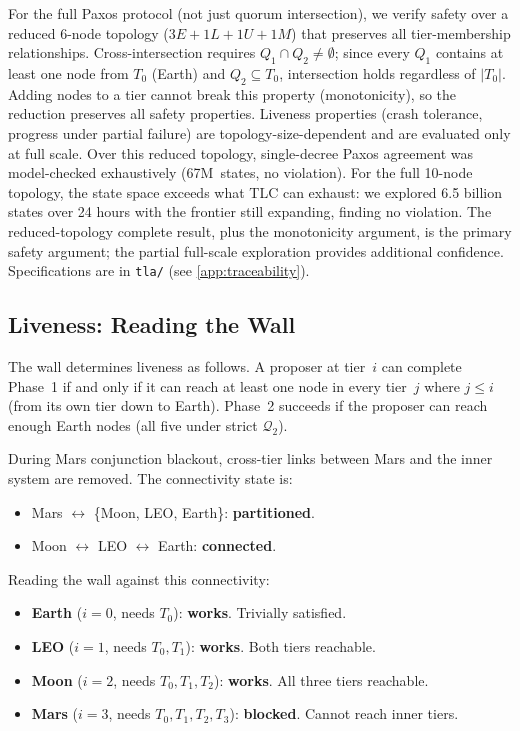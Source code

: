 \documentclass[11pt]{article}
\begin{document}
For the full Paxos protocol (not just quorum intersection), we verify safety over a reduced 6-node topology ($3E + 1L + 1U + 1M$) that preserves all tier-membership relationships. Cross-intersection requires $Q_1 \cap Q_2 \neq \emptyset$; since every $Q_1$ contains at least one node from $T_0$ (Earth) and $Q_2 \subseteq T_0$, intersection holds regardless of $|T_0|$. Adding nodes to a tier cannot break this property (monotonicity), so the reduction preserves all safety properties. Liveness properties (crash tolerance, progress under partial failure) are topology-size-dependent and are evaluated only at full scale. Over this reduced topology, single-decree Paxos agreement was model-checked exhaustively (67M~states, no violation). For the full 10-node topology, the state space exceeds what TLC can exhaust: we explored 6.5 billion states over 24 hours with the frontier still expanding, finding no violation. The reduced-topology complete result, plus the monotonicity argument, is the primary safety argument; the partial full-scale exploration provides additional confidence. Specifications are in \texttt{tla/} (see \autoref{app:traceability}).

\subsection{Liveness: Reading the Wall}
\label{sec:liveness-wall}

The wall determines liveness as follows. A proposer at tier~$i$ can complete Phase~1 if and only if it can reach at least one node in every tier~$j$ where $j \le i$ (from its own tier down to Earth). Phase~2 succeeds if the proposer can reach enough Earth nodes (all five under strict $\mathcal{Q}_2$).

During Mars conjunction blackout, cross-tier links between Mars and the inner system are removed. The connectivity state is:
\begin{itemize}
\item Mars $\leftrightarrow$ \{Moon, LEO, Earth\}: \textbf{partitioned}.
\item Moon $\leftrightarrow$ LEO $\leftrightarrow$ Earth: \textbf{connected}.
\end{itemize}

Reading the wall against this connectivity:
\begin{itemize}
\item \textbf{Earth} ($i{=}0$, needs $T_0$): \textbf{works}. Trivially satisfied.
\item \textbf{LEO} ($i{=}1$, needs $T_0, T_1$): \textbf{works}. Both tiers reachable.
\item \textbf{Moon} ($i{=}2$, needs $T_0, T_1, T_2$): \textbf{works}. All three tiers reachable.
\item \textbf{Mars} ($i{=}3$, needs $T_0, T_1, T_2, T_3$): \textbf{blocked}. Cannot reach inner tiers.
\end{itemize}
\end{document}
